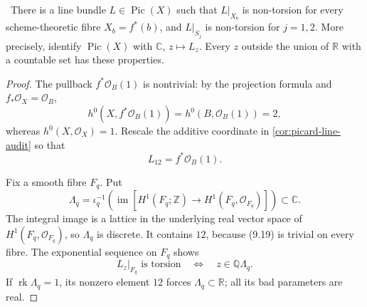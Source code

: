 \begin{theorem}
\label{thm:uniform-nontorsion-audit}
\Verified\ There is a line bundle \(L\in\operatorname{Pic}(X)\) such that
\(L|_{X_b}\) is non-torsion for every scheme-theoretic fibre
\(X_b=f^*(b)\), and \(L|_{S_j}\) is non-torsion for \(j=1,2\).
More precisely, identify \(\operatorname{Pic}(X)\) with \(\mathbb C\),
\(z\mapsto L_z\).  Every \(z\) outside the union of \(\mathbb R\) with a
countable set has these properties.
\end{theorem}

\begin{proof}
The pullback \(f^*\mathcal O_B(1)\) is nontrivial: by the projection
formula and \(f_*\mathcal O_X=\mathcal O_B\),
\[
 h^0(X,f^*\mathcal O_B(1))=h^0(B,\mathcal O_B(1))=2,
\]
whereas \(h^0(X,\mathcal O_X)=1\).  Rescale the additive coordinate in
\cref{cor:picard-line-audit} so that
\[
 L_{12}=f^*\mathcal O_B(1).
\tag{9.19}
\]

Fix a smooth fibre \(F_q\).  Put
\[
 \Lambda_q=\iota_q^{-1}\!\left(
 \operatorname{im}[H^1(F_q;\mathbb Z)\to
 H^1(F_q,\mathcal O_{F_q})]\right)\subset\mathbb C.
\tag{9.20}
\]
The integral image is a lattice in the underlying real vector space of
\(H^1(F_q,\mathcal O_{F_q})\), so \(\Lambda_q\) is discrete.  It contains
\(12\), because (9.19) is trivial on every fibre.  The exponential
sequence on \(F_q\) shows
\[
 L_z|_{F_q}\text{ is torsion}
 \quad\Longleftrightarrow\quad z\in\mathbb Q\Lambda_q.
\tag{9.21}
\]
If \(\operatorname{rk}\Lambda_q=1\), its nonzero element \(12\) forces
\(\Lambda_q\subset\mathbb R\); all its bad parameters are real.


\end{proof}
